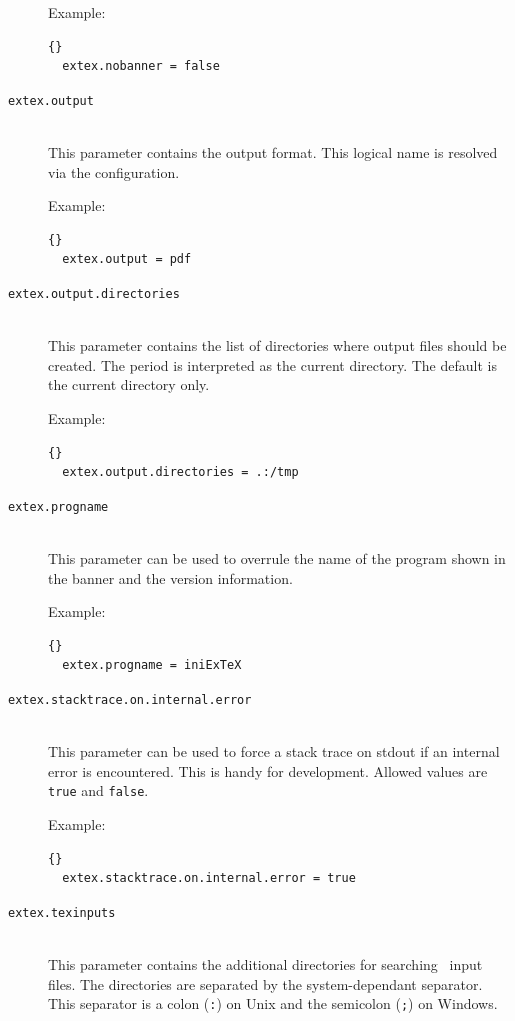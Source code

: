 \documentclass{extex-doc}
\makeatletter
\newcommand\Property[1]{\texttt{#1}\index{#1@\texttt{#1}}}
\makeatother
\begin{document}
\begin{description}
  Example:
\begin{lstlisting}{}
  extex.nobanner = false
\end{lstlisting}


\item[\Property{extex.output}]\ \\
  This parameter contains the output format. This logical name is
  resolved via the configuration.

  Example:
\begin{lstlisting}{}
  extex.output = pdf
\end{lstlisting}

\item[\Property{extex.output.directories}]\ \\
  This parameter contains the list of directories where output files should be
  created. The period is interpreted as the current directory. The
  default is the current directory only.

  Example:
\begin{lstlisting}{}
  extex.output.directories = .:/tmp
\end{lstlisting}

\item[\Property{extex.progname}]\ \\
  This parameter can be used to overrule the name of the program shown
  in the banner and the version information.

  Example:
\begin{lstlisting}{}
  extex.progname = iniExTeX
\end{lstlisting}

\item[\Property{extex.stacktrace.on.internal.error}]\ \\
  This parameter can be used to force a stack trace on stdout if an
  internal error is encountered. This is handy for development.
  Allowed values are \verb|true| and \verb|false|.

  Example:
\begin{lstlisting}{}
  extex.stacktrace.on.internal.error = true
\end{lstlisting}

\item[\Property{extex.texinputs}]\ \\
  This parameter contains the additional directories for searching
  \ExTeX\ input files.
  The directories are separated by the system-dependant separator.
  This separator is a colon (\verb|:|) on Unix and the semicolon
  (\verb|;|) on Windows.


\end{description}
\end{document}
